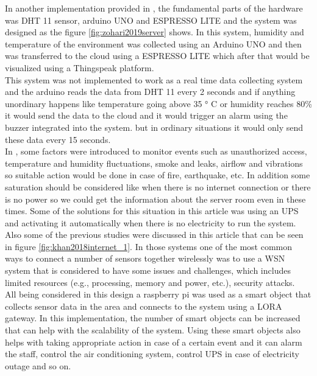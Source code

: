 In another implementation provided in \cite{zohari2019server}, the fundamental parts of the hardware was DHT 11 sensor,  arduino UNO and ESPRESSO LITE and the system was designed as the figure \ref{fig:zohari2019server} shows. In this system, humidity and temperature of the environment was collected using an Arduino UNO and then was transferred to the cloud using a ESPRESSO LITE which after that would be visualized using a Thingspeak platform.\\
This system was not implemented to work as a real time data collecting system and the arduino reads the data from DHT 11 every 2 seconds and if anything unordinary happens like temperature going above 35  ° C or humidity reaches 80\% it would send the data to the cloud and it would trigger an alarm using the buzzer integrated into the system. but in ordinary situations it would only send these data every 15 seconds.\\

In \cite{khan2018internet}, some factors were introduced to monitor events such as unauthorized access, temperature and humidity fluctuations, smoke and leaks, airflow and vibrations so suitable action would be done in case of fire, earthquake, etc. In addition some saturation should be considered like when there is no internet connection or there is no power so we could get the information about the server room even in these times. Some of the solutions for this situation in this article was using an UPS and activating it automatically when there is no electricity to run the system. Also some of the previous studies were discussed in this article that can be seen in figure \ref{fig:khan2018internet_1}. In those systems one of the most common ways to connect a number of sensors together wirelessly was to use a WSN system that is considered to have some issues and challenges, which includes limited resources (e.g., processing, memory and power, etc.), security attacks.\\
All being considered in this design a raspberry pi was used as a smart object that collects sensor data in the area and connects to the system using a LORA gateway. In this implementation, the number of smart objects can be increased that can help with the scalability of the system. Using these smart objects also helps with taking appropriate action in case of a certain event and it can alarm the staff, control the air conditioning system, control UPS in case of electricity outage and so on.\\

